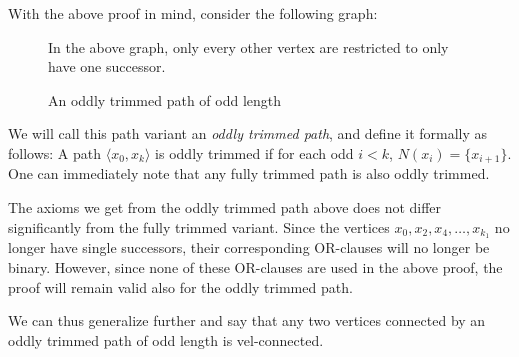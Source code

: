 With the above proof in mind, consider the following graph:\par
\begin{figure}[!h]
  \centering
In the above graph, only every other vertex are restricted to only have one successor.
  \caption{An oddly trimmed path of odd length}
  \label{fig:oddly_trimmed_path}
\end{figure}
\FloatBarrier
We will call this path variant an \textit{oddly trimmed path}, and define it formally as follows:
A path $\langle x_0,x_k\rangle$ is oddly trimmed if for each odd $i < k$, $N(x_i) = \{x_{i+1}\}$.
One can immediately note that any fully trimmed path is also oddly trimmed.

The axioms we get from the oddly trimmed path above does not differ significantly from the fully trimmed variant.
Since the vertices $x_0, x_2, x_4, \dots ,x_{k_1}$ no longer have single successors, their corresponding OR-clauses will no longer be binary.
However, since none of these OR-clauses are used in the above proof, the proof will remain valid also for the oddly trimmed path.

We can thus generalize further and say that any two vertices connected by an oddly trimmed path of odd length is vel-connected.
